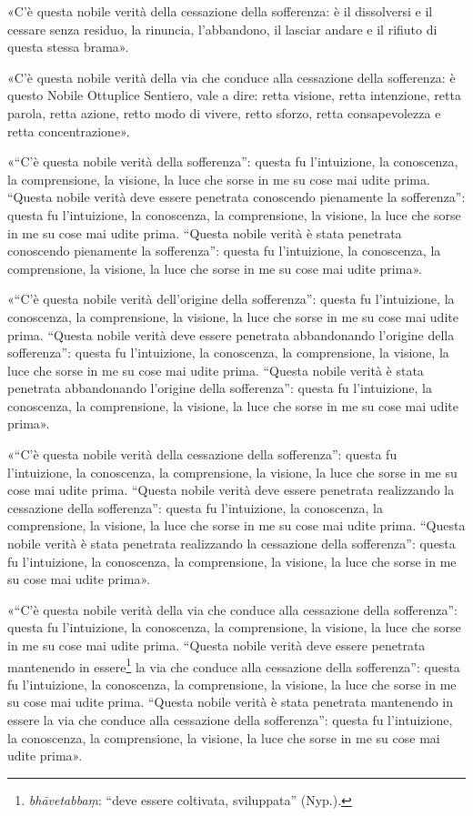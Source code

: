 «C’è questa nobile verità della cessazione della sofferenza: è il dissolversi e
il cessare senza residuo, la rinuncia, l’abbandono, il lasciar andare e il
rifiuto di questa stessa brama».

«C’è questa nobile verità della via che conduce alla cessazione della
sofferenza: è questo Nobile Ottuplice Sentiero, vale a dire: retta visione,
retta intenzione, retta parola, retta azione, retto modo di vivere, retto
sforzo, retta consapevolezza e retta concentrazione».

«“C’è questa nobile verità della sofferenza”: questa fu l’intuizione, la
conoscenza, la comprensione, la visione, la luce che sorse in me su cose mai
udite prima. “Questa nobile verità deve essere penetrata conoscendo pienamente
la sofferenza”: questa fu l’intuizione, la conoscenza, la comprensione, la
visione, la luce che sorse in me su cose mai udite prima. “Questa nobile verità
è stata penetrata conoscendo pienamente la sofferenza”: questa fu l’intuizione,
la conoscenza, la comprensione, la visione, la luce che sorse in me su cose mai
udite prima».

«“C’è questa nobile verità dell’origine della sofferenza”: questa fu
l’intuizione, la conoscenza, la comprensione, la visione, la luce che sorse in
me su cose mai udite prima. “Questa nobile verità deve essere penetrata
abbandonando l’origine della sofferenza”: questa fu l’intuizione, la conoscenza,
la comprensione, la visione, la luce che sorse in me su cose mai udite prima.
“Questa nobile verità è stata penetrata abbandonando l’origine della
sofferenza”: questa fu l’intuizione, la conoscenza, la comprensione, la visione,
la luce che sorse in me su cose mai udite prima».

«“C’è questa nobile verità della cessazione della sofferenza”: questa fu
l’intuizione, la conoscenza, la comprensione, la visione, la luce che sorse in
me su cose mai udite prima. “Questa nobile verità deve essere penetrata
realizzando la cessazione della sofferenza”: questa fu l’intuizione, la
conoscenza, la comprensione, la visione, la luce che sorse in me su cose mai
udite prima. “Questa nobile verità è stata penetrata realizzando la cessazione
della sofferenza”: questa fu l’intuizione, la conoscenza, la comprensione, la
visione, la luce che sorse in me su cose mai udite prima».

«“C’è questa nobile verità della via che conduce alla cessazione della
sofferenza”: questa fu l’intuizione, la conoscenza, la comprensione, la visione,
la luce che sorse in me su cose mai udite prima. “Questa nobile verità deve
essere penetrata mantenendo in essere\footnote{\emph{bhāvetabbaṃ}: “deve essere
  coltivata, sviluppata” (Nyp.).} la via che conduce alla cessazione della
sofferenza”: questa fu l’intuizione, la conoscenza, la comprensione, la visione,
la luce che sorse in me su cose mai udite prima. “Questa nobile verità è stata
penetrata mantenendo in essere la via che conduce alla cessazione della
sofferenza”: questa fu l’intuizione, la conoscenza, la comprensione, la visione,
la luce che sorse in me su cose mai udite prima».

